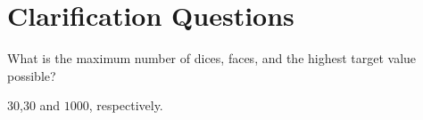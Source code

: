\section{Clarification Questions}

\begin{QandA}
	\item \begin{questionitem} \begin{question} What is the maximum number of dices, faces, and the highest target value possible?  \end{question} 	 
    \begin{answered}
		$30$,$30$ and $1000$, respectively.
	\end{answered} \end{questionitem}
	
\end{QandA}

